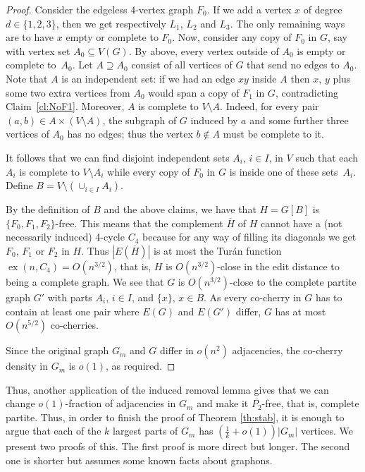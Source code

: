 \documentclass[12pt]{article}
\theoremstyle{definition}
\theoremstyle{remark}
\renewcommand{\O}[1]{\overline{#1}}
\begin{document}
\begin{proof}
Consider the edgeless 4-vertex graph $F_0$. If we add a vertex $x$ of degree $d\in\{1,2,3\}$, then we get respectively $L_1$, $L_2$ and $L_3$. The only remaining ways are to have $x$ empty or complete to $F_0$. Now, consider any copy of $F_0$ in $G$, say with vertex set $A_0\subseteq V(G)$. By above, every vertex outside of $A_0$ is empty or complete to~$A_0$. Let $A\supseteq A_0$ consist of all vertices of $G$ that send no edges to $A_0$. Note that $A$ is an independent set: if we had an edge $xy$ inside $A$ then $x$, $y$ plus some two extra vertices from $A_0$ would span a copy of $F_1$ in $G$, contradicting Claim~\ref{cl:NoF1}. Moreover, $A$ is complete to $V\setminus A$. Indeed, for every pair $(a,b)\in A\times (V\setminus A)$, the subgraph of $G$ induced by $a$ and some further three vertices of $A_0$  has no edges; thus the vertex $b\not\in A$ must be complete to it.

It follows that we can find disjoint independent sets $A_i$, $i\in I$, in $V$ such that each $A_i$ 
is complete to $V\setminus A_i$ while every copy of $F_0$ in $G$ is inside one of these sets~$A_i$. 
Define $B=V\setminus(\cup_{i\in I} A_i)$.

By the definition of $B$ and the above claims, we have that $H=G[B]$ is $\{F_0,F_1,F_2\}$-free. This means that the complement $\O H$ of $H$ cannot have a (not necessarily induced) 4-cycle $C_4$ because for any way of filling its diagonals we get $F_0$, $F_1$ or $F_2$ in $H$. Thus $|E(\O H)|$ is at most the Tur\'an function $\operatorname{ex}(n,C_4)=O(n^{3/2})$, that is, $H$ is $O(n^{3/2})$-close in the edit distance to being a complete graph. We see that $G$ is $O(n^{3/2})$-close to the complete partite graph $G'$ with parts $A_i$, $i\in I$, and $\{x\}$, $x\in B$. As  every co-cherry in $G$ has to contain at least one pair where $E(G)$ and $E(G')$ differ, $G$ has at most $O(n^{5/2})$ co-cherries. 

Since the original graph $G_m$ and $G$ differ in $o(n^2)$ adjacencies, the co-cherry density in $G_m$ is $o(1)$, as required.\end{proof}



Thus, 
another application of the induced removal lemma gives that we can change $o(1)$-fraction of adjacencies in $G_m$ and make it $\O{P_2}$-free, that is, complete partite.
Thus, in order to finish the proof of Theorem \ref{th:stab}, it is enough to argue that each of the $k$ largest parts of $G_m$ has $(\frac1k+o(1))|G_m|$ vertices. We present two proofs of this. The first proof is more direct but longer. The second one is shorter but assumes some known facts about graphons.
\end{document}
